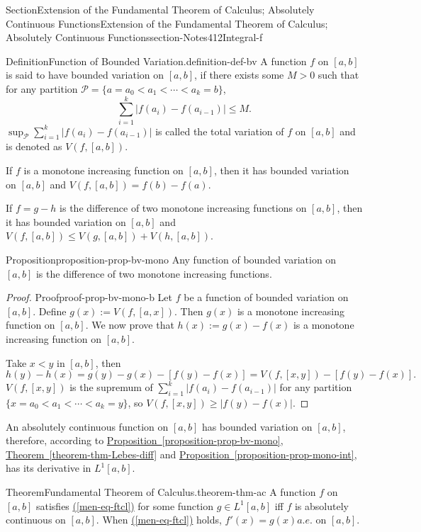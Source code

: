 \documentclass[oneside,10pt,]{article}
\newcommand{\xreffont}{\relax}
\numberwithin{equation}{section}
\newcommand{\cP}{\mathcal{P}}
\begin{document}
\begin{sectionptx}{Section}{Extension of the Fundamental Theorem of Calculus; Absolutely Continuous Functions}{}{Extension of the Fundamental Theorem of Calculus; Absolutely Continuous Functions}{}{}{section-Notes412Integral-f}
\begin{definition}{Definition}{Function of Bounded Variation.}{definition-def-bv}
A function \(f\) on \([a, b]\) is said to have bounded variation on \([a, b]\), if there exists some \(M > 0\) such that for any partition \(\cP=\{a=a_{0} < a_{1} < \cdots < a_{k}=b\}\),%
\begin{equation*}
\sum_{i=1}^{k} |f(a_{i})-f(a_{i-1})| \le M.
\end{equation*}
\(\sup_{\cP} \sum_{i=1}^{k} |f(a_{i})-f(a_{i-1})|\) is called the total variation of \(f\) on \([a, b]\) and is denoted as \(V(f, [a, b])\).%
\end{definition}
If \(f\) is a monotone increasing function on \([a, b]\), then it has bounded variation on \([a, b]\) and \(V(f, [a, b])=f(b)-f(a)\).%
\par
If \(f=g-h\) is the difference of two monotone increasing functions on \([a, b]\), then it has bounded variation on \([a, b]\) and \(V(f, [a, b])\le V(g, [a, b])+V(h, [a, b])\).%
\begin{proposition}{Proposition}{}{}{proposition-prop-bv-mono}%
Any function of bounded variation on \([a, b]\) is the difference of  two monotone increasing functions.\end{proposition}
\begin{proof}{Proof}{}{proof-prop-bv-mono-b}
Let \(f\) be a function of bounded variation on \([a, b]\). Define \(g(x) :=V(f, [a, x])\). Then \(g(x)\) is a monotone increasing function on \([a, b]\). We now prove that \(h(x):=g(x)-f(x)\) is a monotone increasing function on \([a, b]\).%
\par
Take \(x < y\) in \([a, b]\), then%
\begin{equation*}
h(y)-h(x)=g(y)-g(x)-[f(y)-f(x)]=V(f, [x, y]) -[f(y)-f(x)].
\end{equation*}
\(V(f, [x, y])\) is the supremum of \(\sum_{i=1}^{k} |f(a_{i})-f(a_{i-1})|\) for any partition \(\{x= a_{0} < a_{1} < \cdots < a_{k}=y\}\), so \(V(f, [x, y])\ge |f(y)-f(x)|\).%
\end{proof}
An absolutely continuous function on \([a, b]\) has bounded variation on \([a, b]\), therefore, according to \hyperref[proposition-prop-bv-mono]{Proposition~{\xreffont\ref{proposition-prop-bv-mono}}}, \hyperref[theorem-thm-Lebes-diff]{Theorem~{\xreffont\ref{theorem-thm-Lebes-diff}}} and \hyperref[proposition-prop-mono-int]{Proposition~{\xreffont\ref{proposition-prop-mono-int}}}, has its derivative in \(L^{1}[a,  b]\).%
\begin{theorem}{Theorem}{Fundamental Theorem of Calculus.}{}{theorem-thm-ac}%
A function \(f\) on \([a, b]\) satisfies \hyperref[men-eq-ftcl]{({\xreffont\ref{men-eq-ftcl}})} for some function \(g\in L^{1}[a, b]\) iff \(f\) is absolutely continuous on \([a, b]\). When \hyperref[men-eq-ftcl]{({\xreffont\ref{men-eq-ftcl}})} holds, \(f'(x)=g(x)\)\(a.e.\) on \([a, b]\).\end{theorem}

\end{sectionptx}
\end{document}
